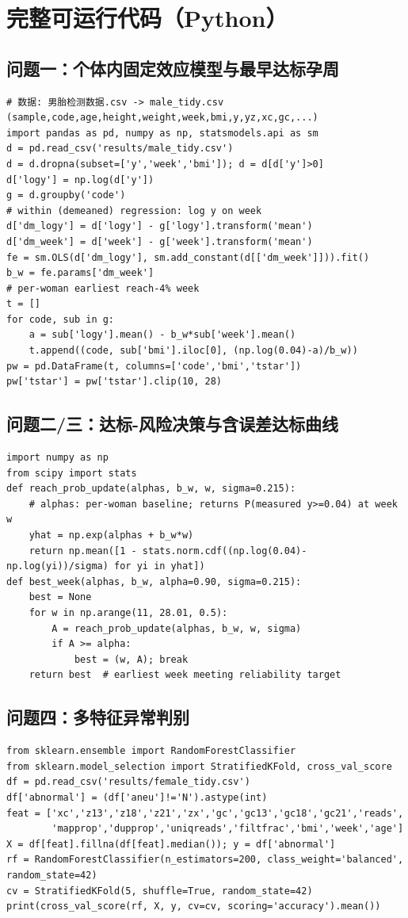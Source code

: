 \documentclass[12pt,a4paper]{article}
\begin{document}
\section{完整可运行代码（Python）}
\subsection{问题一：个体内固定效应模型与最早达标孕周}
\begin{verbatim}
# 数据: 男胎检测数据.csv -> male_tidy.csv (sample,code,age,height,weight,week,bmi,y,yz,xc,gc,...)
import pandas as pd, numpy as np, statsmodels.api as sm
d = pd.read_csv('results/male_tidy.csv')
d = d.dropna(subset=['y','week','bmi']); d = d[d['y']>0]
d['logy'] = np.log(d['y'])
g = d.groupby('code')
# within (demeaned) regression: log y on week
d['dm_logy'] = d['logy'] - g['logy'].transform('mean')
d['dm_week'] = d['week'] - g['week'].transform('mean')
fe = sm.OLS(d['dm_logy'], sm.add_constant(d[['dm_week']])).fit()
b_w = fe.params['dm_week']
# per-woman earliest reach-4% week
t = []
for code, sub in g:
    a = sub['logy'].mean() - b_w*sub['week'].mean()
    t.append((code, sub['bmi'].iloc[0], (np.log(0.04)-a)/b_w))
pw = pd.DataFrame(t, columns=['code','bmi','tstar'])
pw['tstar'] = pw['tstar'].clip(10, 28)
\end{verbatim}

\subsection{问题二/三：达标-风险决策与含误差达标曲线}
\begin{verbatim}
import numpy as np
from scipy import stats
def reach_prob_update(alphas, b_w, w, sigma=0.215):
    # alphas: per-woman baseline; returns P(measured y>=0.04) at week w
    yhat = np.exp(alphas + b_w*w)
    return np.mean([1 - stats.norm.cdf((np.log(0.04)-np.log(yi))/sigma) for yi in yhat])
def best_week(alphas, b_w, alpha=0.90, sigma=0.215):
    best = None
    for w in np.arange(11, 28.01, 0.5):
        A = reach_prob_update(alphas, b_w, w, sigma)
        if A >= alpha:
            best = (w, A); break
    return best  # earliest week meeting reliability target
\end{verbatim}

\subsection{问题四：多特征异常判别}
\begin{verbatim}
from sklearn.ensemble import RandomForestClassifier
from sklearn.model_selection import StratifiedKFold, cross_val_score
df = pd.read_csv('results/female_tidy.csv')
df['abnormal'] = (df['aneu']!='N').astype(int)
feat = ['xc','z13','z18','z21','zx','gc','gc13','gc18','gc21','reads',
        'mapprop','dupprop','uniqreads','filtfrac','bmi','week','age']
X = df[feat].fillna(df[feat].median()); y = df['abnormal']
rf = RandomForestClassifier(n_estimators=200, class_weight='balanced', random_state=42)
cv = StratifiedKFold(5, shuffle=True, random_state=42)
print(cross_val_score(rf, X, y, cv=cv, scoring='accuracy').mean())
\end{verbatim}
\end{document}
